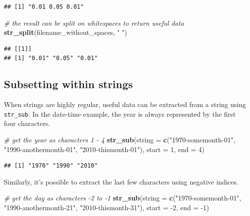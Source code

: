 \documentclass[]{book}
\newenvironment{Shaded}{}{}
\newcommand{\CommentTok}[1]{\textcolor[rgb]{0.38,0.63,0.69}{\textit{#1}}}
\newcommand{\DataTypeTok}[1]{\textcolor[rgb]{0.56,0.13,0.00}{#1}}
\newcommand{\DecValTok}[1]{\textcolor[rgb]{0.25,0.63,0.44}{#1}}
\newcommand{\KeywordTok}[1]{\textcolor[rgb]{0.00,0.44,0.13}{\textbf{#1}}}
\newcommand{\NormalTok}[1]{#1}
\newcommand{\StringTok}[1]{\textcolor[rgb]{0.25,0.44,0.63}{#1}}
\begin{document}
\begin{verbatim}
## [1] "0.01 0.05 0.01"
\end{verbatim}

\begin{Shaded}
\begin{Highlighting}[]
\CommentTok{# the result can be split on whitespaces to return useful data}
\KeywordTok{str_split}\NormalTok{(filename_without_spaces, }\StringTok{" "}\NormalTok{)}
\end{Highlighting}
\end{Shaded}

\begin{verbatim}
## [[1]]
## [1] "0.01" "0.05" "0.01"
\end{verbatim}

\hypertarget{subsetting-within-strings}{%
\subsection{Subsetting within strings}\label{subsetting-within-strings}}

When strings are highly regular, useful data can be extracted from a string using \texttt{str\_sub}. In the date-time example, the year is always represented by the first four characters.

\begin{Shaded}
\begin{Highlighting}[]
\CommentTok{# get the year as characters 1 - 4}
\KeywordTok{str_sub}\NormalTok{(}\DataTypeTok{string =} \KeywordTok{c}\NormalTok{(}\StringTok{"1970-somemonth-01"}\NormalTok{,}
                   \StringTok{"1990-anothermonth-01"}\NormalTok{,}
                   \StringTok{"2010-thismonth-01"}\NormalTok{),}
        \DataTypeTok{start =} \DecValTok{1}\NormalTok{, }\DataTypeTok{end =} \DecValTok{4}\NormalTok{)}
\end{Highlighting}
\end{Shaded}

\begin{verbatim}
## [1] "1970" "1990" "2010"
\end{verbatim}

Similarly, it's possible to extract the last few characters using negative indices.

\begin{Shaded}
\begin{Highlighting}[]
\CommentTok{# get the day as characters -2 to -1}
\KeywordTok{str_sub}\NormalTok{(}\DataTypeTok{string =} \KeywordTok{c}\NormalTok{(}\StringTok{"1970-somemonth-01"}\NormalTok{,}
                   \StringTok{"1990-anothermonth-21"}\NormalTok{,}
                   \StringTok{"2010-thismonth-31"}\NormalTok{),}
        \DataTypeTok{start =} \DecValTok{-2}\NormalTok{, }\DataTypeTok{end =} \DecValTok{-1}\NormalTok{)}
\end{Highlighting}
\end{Shaded}
\end{document}
